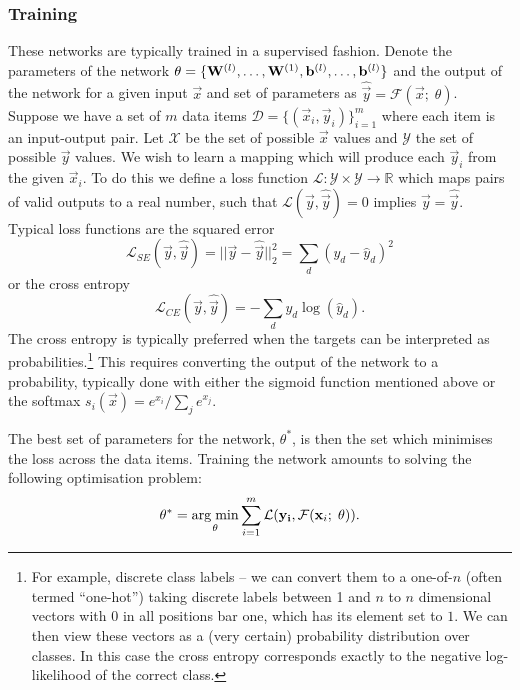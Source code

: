 \subsubsection{Training}
These networks are typically trained in a supervised fashion. Denote the parameters of the network
\(\theta = \{\mathbf{W}^{(l)}, \ldots, \mathbf{W}^{(1)}, \mathbf{b}^{(l)}, \ldots, \mathbf{b}^{(l)}\}\) and
the output of the network for a given input \(\vec{x}\) and set of parameters as 
\(\hat{\vec{y}} = \mathcal{F}(\vec{x};\; \theta)\). Suppose we have a set of \(m\) data items
\(\mathcal{D} = \{(\vec{x}_i, \vec{y}_i)\}_{i=1}^m\) where each item is an input-output pair. 
Let \(\mathcal{X}\) be the set of possible \(\vec{x}\) values and \(\mathcal{Y}\) the set of
possible \(\vec{y}\) values.
We
wish to learn a mapping which will produce each \(\vec{y}_i\) from the given \(\vec{x}_i\). 
To do this we define a loss function
\(\mathcal{L} : \mathcal{Y} \times \mathcal{Y} \to \mathbb{R}\) which maps pairs of valid outputs
to a real number, such that \(\mathcal{L}(\vec{y}, \hat{\vec{y}}) = 0\) implies 
\(\vec{y} = \hat{\vec{y}}\). Typical loss functions are the squared error
\begin{equation} \label{eq:squarederror}
	\mathcal{L}_{SE}(\vec{y}, \hat{\vec{y}}) = ||\vec{y} - \hat{\vec{y}}||^2_2 
	= \sum_d (y_d - \hat{y}_d)^2
\end{equation} or the cross entropy
\begin{equation}
	\mathcal{L}_{CE}(\vec{y}, \hat{\vec{y}}) = -\sum_d y_d \log(\hat{y}_d).
\end{equation} The cross entropy is typically preferred when the targets can be interpreted as
probabilities.\footnote{For example, discrete class labels -- we can convert them to a one-of-\(n\)
(often termed ``one-hot'') taking discrete labels between 1 and \(n\) to \(n\) dimensional vectors
with \(0\) in all positions bar one, which has its element set to \(1\). We can then view these
vectors as a (very certain) probability distribution over classes. In this case the cross entropy
corresponds exactly to the negative log-likelihood of the correct class.} This requires converting
the output of the network to a probability, typically done with either the sigmoid function 
mentioned above or the softmax \(s_i(\vec{x}) = e^{x_i}/\sum_j e^{x_j}\).

The best set of parameters for the network, \(\theta^*\), is then the set which minimises the
loss across the data items. Training the network amounts to solving the following
optimisation problem:
\begin{equation}\label{eq:nnoptimise}
	\theta^* = 
	\operatorname*{arg\;min}_{\theta} \sum_{i=1}^m \mathcal{L}(\mathbf{y_i}, \mathcal{F}(\mathbf{x}_i;\; \theta)).
\end{equation}

